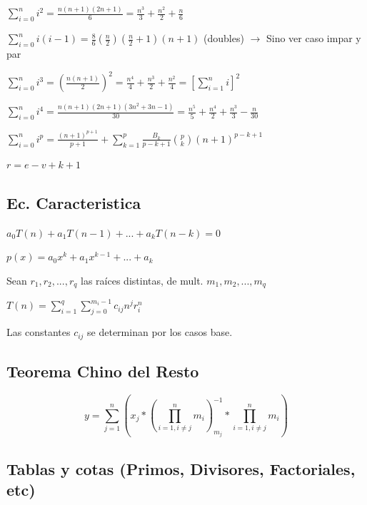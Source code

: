 $\sum_{i=0}^n i^2 = \frac{n(n+1)(2n+1)}{6} = \frac{n^3}{3} + \frac{n^2}{2} + \frac{n}{6}$

$\sum_{i=0}^n i(i-1) = \frac{8}{6}(\frac{n}{2})(\frac{n}{2}+1)(n+1)$ (doubles) $\rightarrow$ Sino ver caso impar y par

$\sum_{i=0}^n i^3 = \left(\frac{n(n+1)}{2}\right)^2 = \frac{n^4}{4} + \frac{n^3}{2} + \frac{n^2}{4} = \left[\sum_{i=1}^n i\right]^2$

$\sum_{i=0}^n i^4 = \frac{n(n+1)(2n+1)(3n^2+3n-1)}{30} = \frac{n^5}{5} + \frac{n^4}{2} + \frac{n^3}{3} - \frac{n}{30}$

$\sum_{i=0}^n i^p = \frac{(n+1)^{p+1}}{p+1} + \sum_{k=1}^p\frac{B_k}{p-k+1}{p\choose k}(n+1)^{p-k+1}$

$r=e-v+k+1$




\subsection{Ec. Caracteristica}
$a_0T(n)+a_1T(n-1)+...+a_kT(n-k)=0$

$p(x)=a_0 x^k + a_1 x^{k-1} + ... + a_k$

Sean $r_1,r_2,...,r_q$ las raíces distintas, de mult. $m_1, m_2, ..., m_q$

$T(n)=\sum_{i=1}^q{\sum_{j=0}^{m_i - 1}c_{ij} n^j r_i^n}$

Las constantes $c_{ij}$ se determinan por los casos base.
\subsection{Teorema Chino del Resto}
$$y=\sum_{j=1}^n (x_j*(\prod_{i=1, i\neq j}^n m_i)_{m_j}^{-1}*\prod_{i=1, i\neq j}^n m_i)$$
\subsection{Tablas y cotas (Primos, Divisores, Factoriales, etc)}

